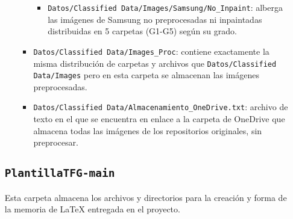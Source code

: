 \begin{itemize}
\begin{itemize}
\begin{itemize}
\begin{itemize}
                \item \texttt{Datos/Classified Data/Images/Samsung/No\_Inpaint}: alberga las imágenes de Samsung no preprocesadas ni inpaintadas distribuidas en 5 carpetas (G1-G5) según su grado.
        \end{itemize}
        \item \texttt{Datos/Classified Data/Images\_Proc}: contiene exactamente la misma distribución de carpetas y archivos que \texttt{Datos/Classified Data/Images} pero en esta carpeta se almacenan las imágenes preprocesadas.
        \item \texttt{Datos/Classified Data/Almacenamiento\_OneDrive.txt}: archivo de texto en el que se encuentra en enlace a la carpeta de OneDrive que almacena todas las imágenes de los repositorios originales, sin preprocesar.
    \end{itemize}
\end{itemize}

\subsection{\texttt{PlantillaTFG-main}}

Esta carpeta almacena los archivos y directorios para la creación y forma de la memoria de LaTeX entregada en el proyecto. 


\end{itemize}
